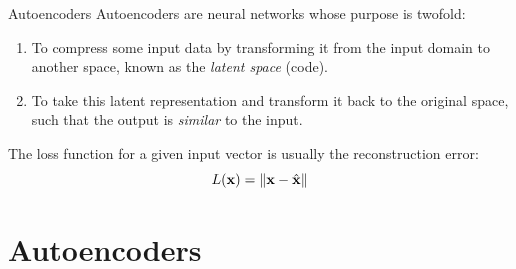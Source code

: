 \documentclass[xcolor=pdftex,dvipsnames,table,mathserif]{beamer}
\begin{document}
\begin{frame}{Autoencoders}
Autoencoders are neural networks whose purpose is twofold:
\begin{enumerate}
\item To compress some input data by transforming it from the input domain to another space,
known as the \emph{latent space} (code).
\item To take this latent representation and transform it back to the original space, such that the output is \emph{similar} to the input.
\end{enumerate}

\begin{figure}
\centering
{}
\end{figure}

The loss function for a given input vector is usually the reconstruction error:
\[
L(\mathbf{x}) = \norm{ \mathbf{x}-\hat{\mathbf{x}}}
\]


\end{frame}


\section{Autoencoders}
\end{document}
